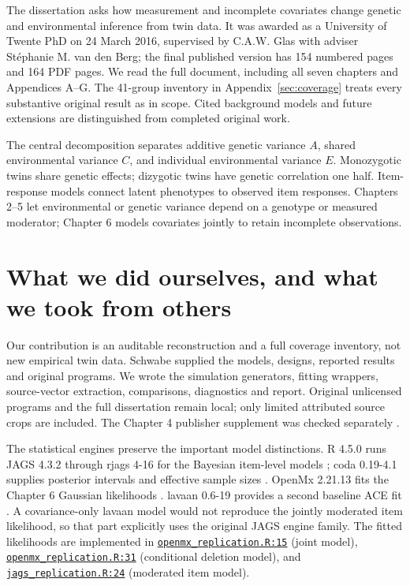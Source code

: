 The dissertation asks how measurement and incomplete covariates change genetic and environmental inference from twin data. It was awarded as a University of Twente PhD on 24 March 2016, supervised by C.A.W. Glas with adviser St\'ephanie M. van den Berg; the final published version has 154 numbered pages and 164 PDF pages. We read the full document, including all seven chapters and Appendices A--G. The 41-group inventory in Appendix~\ref{sec:coverage} treats every substantive original result as in scope. Cited background models and future extensions are distinguished from completed original work.

The central decomposition separates additive genetic variance $A$, shared environmental variance $C$, and individual environmental variance $E$. Monozygotic twins share genetic effects; dizygotic twins have genetic correlation one half. Item-response models connect latent phenotypes to observed item responses. Chapters 2--5 let environmental or genetic variance depend on a genotype or measured moderator; Chapter 6 models covariates jointly to retain incomplete observations.

\section{What we did ourselves, and what we took from others}
Our contribution is an auditable reconstruction and a full coverage inventory, not new empirical twin data. Schwabe supplied the models, designs, reported results and original programs. We wrote the simulation generators, fitting wrappers, source-vector extraction, comparisons, diagnostics and report. Original unlicensed programs and the full dissertation remain local; only limited attributed source crops are included. The Chapter 4 publisher supplement was checked separately \citep{schwabeConservatism}.

The statistical engines preserve the important model distinctions. R 4.5.0 \citep{r2025} runs JAGS 4.3.2 through rjags 4-16 for the Bayesian item-level models \citep{rjags2024}; coda 0.19-4.1 supplies posterior intervals and effective sample sizes \citep{coda2006}. OpenMx 2.21.13 fits the Chapter 6 Gaussian likelihoods \citep{neale2016}. lavaan 0.6-19 provides a second baseline ACE fit \citep{rosseel2012}. A covariance-only lavaan model would not reproduce the jointly moderated item likelihood, so that part explicitly uses the original JAGS engine family. The fitted likelihoods are implemented in \href{https://github.com/alectionary/vibe-math/blob/master/formalization/schwabe-psychometric-genetics/simulation/openmx_replication.R\#L15}{\nolinkurl{openmx_replication.R:15}} (joint model), \href{https://github.com/alectionary/vibe-math/blob/master/formalization/schwabe-psychometric-genetics/simulation/openmx_replication.R\#L31}{\nolinkurl{openmx_replication.R:31}} (conditional deletion model), and \href{https://github.com/alectionary/vibe-math/blob/master/formalization/schwabe-psychometric-genetics/simulation/jags_replication.R\#L24}{\nolinkurl{jags_replication.R:24}} (moderated item model).


